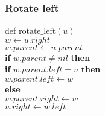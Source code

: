 \documentclass{beamer}
\newcommand{\eq}{=}
\begin{document}
\begin{frame}[shrink]
\frametitle{Rotate left}
\begin{flushleft}
\hspace*{1em}def \ensuremath{\mathrm{rotate\_left}(\ensuremath{\mathit{u}})}\\
\hspace*{1em} \hspace*{1em} \ensuremath{\ensuremath{\mathit{w}} \gets  \ensuremath{\ensuremath{\mathit{u}}.right}}\\
\hspace*{1em} \hspace*{1em} \ensuremath{\ensuremath{\mathit{w}}.\ensuremath{parent} \gets  \ensuremath{\ensuremath{\mathit{u}}.parent}}\\
\hspace*{1em} \hspace*{1em} {\color{black} \textbf{if}} \ensuremath{\ensuremath{\mathit{w}}.\ensuremath{\mathit{parent}} \ne nil} {\color{black} \textbf{then}} \\
\hspace*{1em} \hspace*{1em} \hspace*{1em} {\color{black} \textbf{if}} \ensuremath{\ensuremath{\mathit{w}}.\ensuremath{\mathit{parent}}.\ensuremath{\mathit{left}} \eq u} {\color{black} \textbf{then}} \\
\hspace*{1em} \hspace*{1em} \hspace*{1em} \hspace*{1em} \ensuremath{\ensuremath{\mathit{w}}.\ensuremath{\ensuremath{\mathit{parent}}.left} \gets  \ensuremath{w}}\\
\hspace*{1em} \hspace*{1em} \hspace*{1em} {\color{black} \textbf{else}} \\
\hspace*{1em} \hspace*{1em} \hspace*{1em} \hspace*{1em} \ensuremath{\ensuremath{\mathit{w}}.\ensuremath{\ensuremath{\mathit{parent}}.right} \gets  \ensuremath{w}}\\
\hspace*{1em} \hspace*{1em} \ensuremath{\ensuremath{\mathit{u}}.\ensuremath{right} \gets  \ensuremath{\ensuremath{\mathit{w}}.left}}\\

\end{flushleft}
\end{frame}
\end{document}
